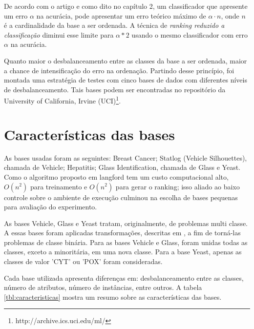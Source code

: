 De acordo com o artigo \cite{Langford08} e como dito no capítulo 2, um classificador que apresente um erro $\alpha$ na acurácia, pode apresentar um erro teórico máximo de $\alpha \cdot n$, onde $n$ é a cardinalidade da base a ser ordenada. A técnica de \emph{ranking reduzido a classificação} diminui esse limite para $\alpha * 2$ usando o mesmo classificador com erro $\alpha$ na acurácia.

Quanto maior o desbalanceamento entre as classes da base a ser ordenada, maior a chance de intensificação do erro na ordenação. Partindo desse princípio, foi montada uma estratégia de testes com cinco bases de dados com diferentes níveis de desbalanceamento. Tais bases podem ser encontradas no repositório da University of California, Irvine (UCI)\footnote{http://archive.ics.uci.edu/ml/}.

\section{Características das bases}

As bases usadas foram as seguintes: Breast Cancer; Statlog (Vehicle Silhouettes), chamada de Vehicle; Hepatitis; Glass Identification, chamada de Glass e Yeast. Como o algoritmo proposto em {{langford}} tem um custo computacional alto, $O(n^2)$ para treinamento e $O(n^2)$ para gerar o ranking; isso aliado ao baixo controle sobre o ambiente de execução culminou na escolha de bases pequenas para avaliação do experimento.

As bases Vehicle, Glass e Yeast tratam, originalmente, de problemas multi classe. A essas bases foram aplicadas transformações, descritas em \cite{guo04}, a fim de torná-las problemas de classe binária. Para as bases Vehicle e Glass, foram unidas todas as classes, exceto a minoritária, em uma nova classe. Para a base Yeast, apenas as classes de valor 'CYT' ou 'POX' foram consideradas.

Cada base utilizada apresenta diferenças em: desbalanceamento entre as classes, número de atributos, número de instâncias, entre outros. A tabela \ref{tbl:caracteristicas} mostra um resumo sobre as características das bases.

